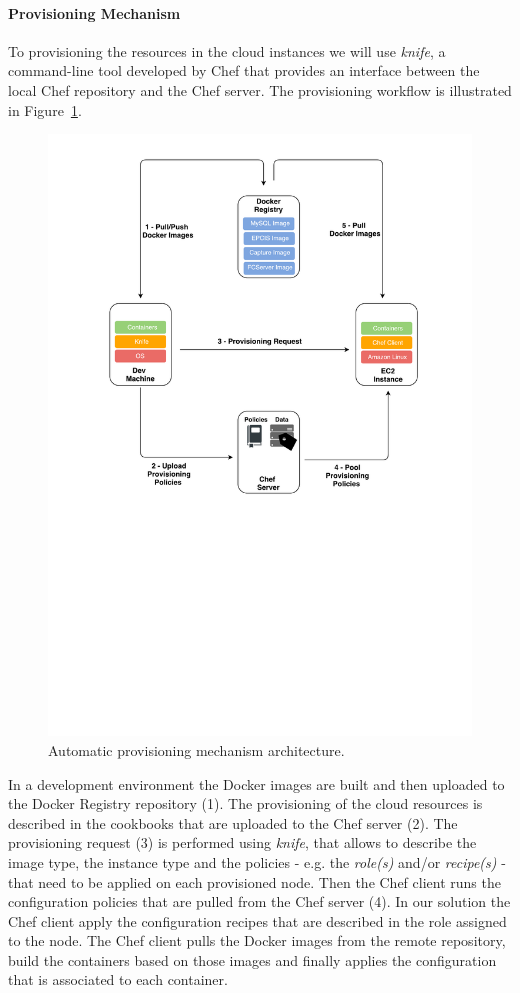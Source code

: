 \paragraph{Provisioning Mechanism}
\label{par:provisioning_mechanism}
To provisioning the resources in the cloud instances we will use \textit{knife}, a command-line tool
developed by Chef that provides an interface between the local Chef repository and the Chef server.
The provisioning workflow is illustrated in Figure~\ref{fig:provisioning_tech_architecture}.

\begin{figure}[ht!]
  \centering
  \includegraphics[width=.5\textwidth]{./figures/c4t-tech-architecture}
  \caption{Automatic provisioning mechanism architecture.}
  \label{fig:provisioning_tech_architecture}
\end{figure}

In a development environment the Docker images are built and then uploaded to the Docker Registry
repository (1). The provisioning of the cloud resources is described in the cookbooks that are uploaded
to the Chef server (2). The provisioning request (3) is performed using \textit{knife}, that allows to
describe the image type, the instance type and the policies - e.g. the \textit{role(s)} and/or \textit{recipe(s)} -
that need to be applied on each provisioned node. Then the Chef client runs the configuration policies
that are pulled from the Chef server (4). In our solution the Chef client apply the configuration recipes
that are described in the role assigned to the node. The Chef client pulls the Docker images from the
remote repository, build the containers based on those images and finally applies the configuration
that is associated to each container.

